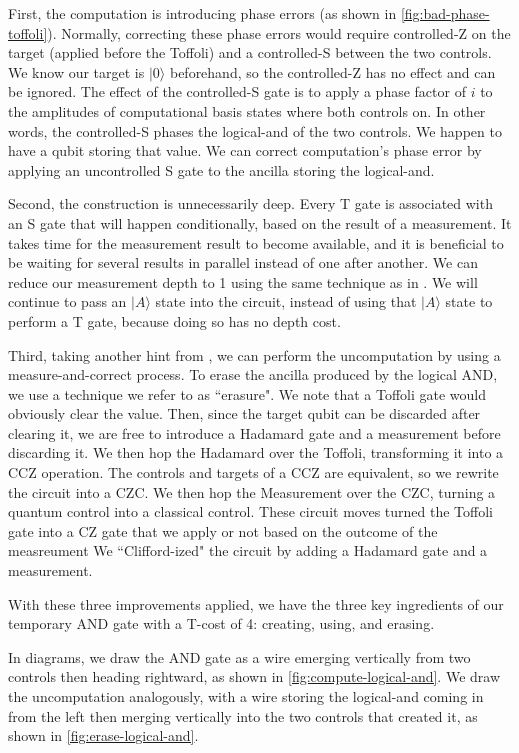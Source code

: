 \documentclass[twocolumn,longbibliography]{quantumarticle-customized}
\begin{document}
First, the computation is introducing phase errors (as shown in \autoref{fig:bad-phase-toffoli}).
Normally, correcting these phase errors would require controlled-Z on the target (applied before the Toffoli) and a controlled-S between the two controls.
We know our target is $|0\rangle$ beforehand, so the controlled-Z has no effect and can be ignored.
The effect of the controlled-S gate is to apply a phase factor of $i$ to the amplitudes of computational basis states where both controls on.
In other words, the controlled-S phases the logical-and of the two controls.
We happen to have a qubit storing that value.
We can correct computation's phase error by applying an uncontrolled S gate to the ancilla storing the logical-and.

Second, the construction is unnecessarily deep.
Every T gate is associated with an S gate that will happen conditionally, based on the result of a measurement.
It takes time for the measurement result to become available, and it is beneficial to be waiting for several results in parallel instead of one after another.
We can reduce our measurement depth to 1 using the same technique as in \cite{Jones2013}.
We will continue to pass an $|A\rangle$ state into the circuit, instead of using that $|A\rangle$ state to perform a T gate, because doing so has no depth cost.

Third, taking another hint from \cite{Jones2013}, we can perform the uncomputation by using a measure-and-correct process.
To erase the ancilla produced by the logical AND, we use a technique we refer to as ``erasure".
We note that a Toffoli gate would obviously clear the value.
Then, since the target qubit can be discarded after clearing it, we are free to introduce a Hadamard gate and a measurement before discarding it.
We then hop the Hadamard over the Toffoli, transforming it into a CCZ operation.
The controls and targets of a CCZ are equivalent, so we rewrite the circuit into a CZC.
We then hop the Measurement over the CZC, turning a quantum control into a classical control.
These circuit moves turned the Toffoli gate into a CZ gate that we apply or not based on the outcome of the measreument
We ``Clifford-ized" the circuit by adding a Hadamard gate and a measurement.

With these three improvements applied, we have the three key ingredients of our temporary AND gate with a T-cost of 4: creating, using, and erasing.

In diagrams, we draw the AND gate as a wire emerging vertically from two controls then heading rightward, as shown in \autoref{fig:compute-logical-and}.
We draw the uncomputation analogously, with a wire storing the logical-and coming in from the left then merging vertically into the two controls that created it, as shown in \autoref{fig:erase-logical-and}.
\end{document}
